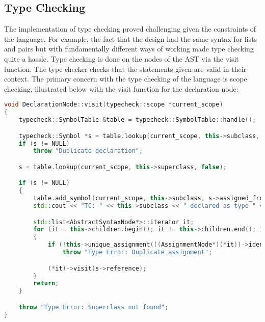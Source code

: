 \subsection{Type Checking}

The implementation of type checking proved challenging given the constraints of the language. For example, the fact that the design had the same syntax for lists and pairs but with fundamentally different ways of working made type checking quite a hassle.
\vspace{10pt}
Type checking is done on the nodes of the AST via the visit function. The type checker checks that the statements given are valid in their context. The primary concern with the type checking of the language is scope checking, illustrated below with the visit function for the declaration node:

\begin{lstlisting}[language = c++]
void DeclarationNode::visit(typecheck::scope *current_scope)
{
	typecheck::SymbolTable &table = typecheck::SymbolTable::handle();

	typecheck::Symbol *s = table.lookup(current_scope, this->subclass, false);
	if (s != NULL)
		throw "Duplicate declaration";

	s = table.lookup(current_scope, this->superclass, false);

	if (s != NULL)
	{
		table.add_symbol(current_scope, this->subclass, s->assigned_from, s->assigns, s->reference);
		std::cout << "TC: " << this->subclass << " declared as type " << this->superclass << std::endl;

		std::list<AbstractSyntaxNode*>::iterator it;
		for (it = this->children.begin(); it != this->children.end(); it++)
		{
			if (!this->unique_assignment(((AssignmentNode*)(*it))->identifier))
				throw "Type Error: Duplicate assignment";

			(*it)->visit(s->reference);
		}
		return;
	}

	throw "Type Error: Superclass not found";
}
\end{lstlisting}

